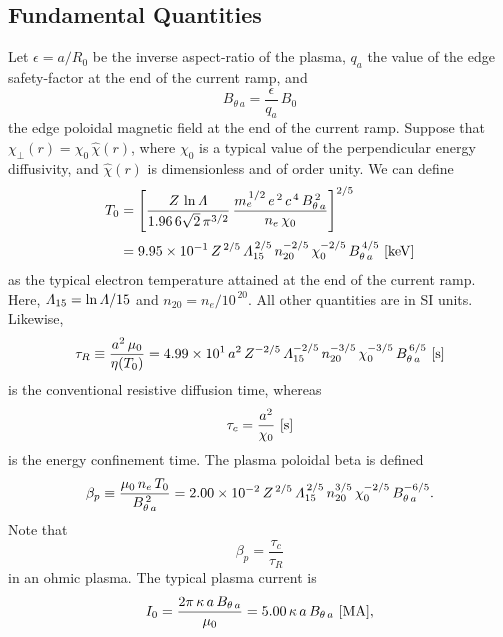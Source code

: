 \documentclass[12pt,prb,aps]{revtex4-1}
\begin{document}
 \subsection{Fundamental Quantities}
 Let $\epsilon= a/R_0$ be the inverse aspect-ratio of the plasma, $q_a$ the value of the edge safety-factor at the end of the current ramp, and 
 \begin{equation}
 B_{\theta\,a}= \frac{\epsilon}{q_a}\,B_0
 \end{equation}
 the edge poloidal magnetic field at the end of the current ramp. Suppose that $\chi_\perp (r)= \chi_0\,\hat{\chi}(r)$, where $\chi_0$ is a
 typical value of the perpendicular energy diffusivity, and $\hat{\chi}(r)$ is dimensionless and of order unity. 
 We can define
 \begin{align}
 T_0&= \left[\frac{Z\,\ln{\mit\Lambda}}{1.96\,6\sqrt{2}\,\pi^{3/2}}\,\frac{m_e^{\,1/2}\,e^{\,2}\,c^{\,4}\,B_{\theta\,a}^{\,2}}{n_e\,\chi_0}\right]^{2/5}\\[0.5ex]
 &= 9.95\times 10^{-1}\,Z^{\,2/5}\,{\mit\Lambda}_{15}^{\,2/5}\,n_{20}^{-2/5}\,\chi_0^{-2/5}\,B_{\theta\,a}^{\,4/5}\,\,[{\rm keV}]
 \end{align}
 as the typical electron temperature attained at the end of the current ramp. Here, ${\mit\Lambda}_{15}=\ln{\mit\Lambda}/15$ and $n_{20}=n_e/10^{\,20}$. 
 All other quantities are in SI units. Likewise, 
 \begin{equation}
 \tau_R \equiv \frac{a^2\,\mu_0}{\eta(T_0)}= 4.99\times 10^1\,a^2\,Z^{-2/5}\,{\mit\Lambda}_{15}^{-2/5}\,n_{20}^{-3/5}\,\chi_0^{-3/5}\,B_{\theta\,a}^{\,6/5}\,\,[{\rm s}]
 \end{equation}
 is the conventional resistive diffusion time, whereas 
 \begin{equation}
 \tau_c= \frac{a^2}{\chi_0}\,\,[{\rm s}]
 \end{equation}
 is the energy confinement time. The plasma poloidal beta is defined
 \begin{equation}\label{e16}
 \beta_p\equiv \frac{\mu_0\,n_e\,T_0}{B_{\theta\,a}^{\,2}} =  2.00\times 10^{-2}\,Z^{\,2/5}\,{\mit\Lambda}_{15}^{\,2/5}\,n_{20}^{3/5}\,\chi_0^{-2/5}\,B_{\theta\,a}^{-6/5}.
 \end{equation}
 Note that
 \begin{equation}\label{e17}
 \beta_p = \frac{\tau_c}{\tau_R}
 \end{equation}
 in an ohmic plasma. 
 The typical plasma current is
 \begin{equation}
 I_0= \frac{2\pi\,\kappa\,a\,B_{\theta\,a}}{\mu_0} = 5.00\,\kappa\,a\,B_{\theta\,a}\,\,[{\rm MA}],
 \end{equation}
\end{document}

